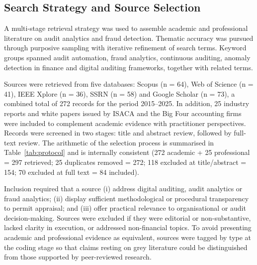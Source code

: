 \documentclass[conference]{IEEEtran}
\begin{document}
\subsection{Search Strategy and Source Selection}

A multi-stage retrieval strategy was used to assemble academic and professional literature on audit analytics and fraud detection. Thematic accuracy was pursued through purposive sampling with iterative refinement of search terms. Keyword groups spanned audit automation, fraud analytics, continuous auditing, anomaly detection in finance and digital auditing frameworks, together with related terms.

Sources were retrieved from five databases: Scopus (n = 64), Web of Science (n = 41), IEEE Xplore (n = 36), SSRN (n = 58) and Google Scholar (n = 73), a combined total of 272 records for the period 2015--2025. In addition, 25 industry reports and white papers issued by ISACA and the Big Four accounting firms were included to complement academic evidence with practitioner perspectives. Records were screened in two stages: title and abstract review, followed by full-text review. The arithmetic of the selection process is summarised in Table~\ref{tab:protocol} and is internally consistent (272 academic + 25 professional = 297 retrieved; 25 duplicates removed = 272; 118 excluded at title/abstract = 154; 70 excluded at full text = 84 included).

Inclusion required that a source (i) address digital auditing, audit analytics or fraud analytics; (ii) display sufficient methodological or procedural transparency to permit appraisal; and (iii) offer practical relevance to organisational or audit decision-making. Sources were excluded if they were editorial or non-substantive, lacked clarity in execution, or addressed non-financial topics. To avoid presenting academic and professional evidence as equivalent, sources were tagged by type at the coding stage so that claims resting on grey literature could be distinguished from those supported by peer-reviewed research.

\end{document}
